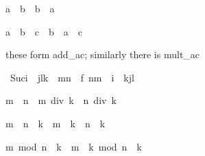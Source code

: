 \begin{isabellebody}
\begin{isamarkuptext}
\begin{isabelle}%
a\ {\isacharplus}\ b\ {\isacharequal}\ b\ {\isacharplus}\ a%
\end{isabelle}

\begin{isabelle}%
a\ {\isacharplus}\ {\isacharparenleft}b\ {\isacharplus}\ c{\isacharparenright}\ {\isacharequal}\ b\ {\isacharplus}\ {\isacharparenleft}a\ {\isacharplus}\ c{\isacharparenright}%
\end{isabelle}

these form add_ac; similarly there is mult_ac%
\end{isamarkuptext}%
\isamarkuptrue%
\ {\isachardoublequote}Suc{\isacharparenleft}i\ {\isacharplus}\ j{\isacharasterisk}l{\isacharasterisk}k\ {\isacharplus}\ m{\isacharasterisk}n{\isacharparenright}\ {\isacharequal}\ f\ {\isacharparenleft}n{\isacharasterisk}m\ {\isacharplus}\ i\ {\isacharplus}\ k{\isacharasterisk}j{\isacharasterisk}l{\isacharparenright}{\isachardoublequote}\isamarkupfalse%
\isamarkuptrue%
\isamarkupfalse%
\isamarkuptrue%
\isamarkupfalse%
%
\begin{isamarkuptext}%
\begin{isabelle}%
m\ {\isasymle}\ n\ {\isasymLongrightarrow}\ m\ div\ k\ {\isasymle}\ n\ div\ k%
\end{isabelle}

\begin{isabelle}%
{\isacharparenleft}m\ {\isacharminus}\ n{\isacharparenright}\ {\isacharasterisk}\ k\ {\isacharequal}\ m\ {\isacharasterisk}\ k\ {\isacharminus}\ n\ {\isacharasterisk}\ k%
\end{isabelle}

\begin{isabelle}%
m\ mod\ n\ {\isacharasterisk}\ k\ {\isacharequal}\ m\ {\isacharasterisk}\ k\ mod\ {\isacharparenleft}n\ {\isacharasterisk}\ k{\isacharparenright}%
\end{isabelle}


\end{isamarkuptext}
\end{isabellebody}
